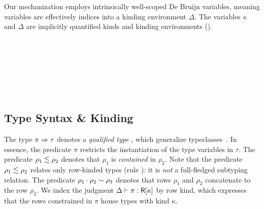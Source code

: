\documentclass[sigplan,screen]{acmart}
\begin{document}
Our mechanization employs intrinsically well-scoped De Bruijn variables, meaning variables are effectively indices into a kinding environment $\Delta$. The variables $\kappa$ and $\Delta$ are implicitly quantified kinds and kinding environments ().

\begin{code}[hide]%
%
\>[2]\<%
\\
\>[2][@{}l@{\AgdaIndent{0}}]%
\>[4]\<%
\\
\>[4][@{}l@{\AgdaIndent{0}}]%
\>[6]\AgdaSpace{}%
\AgdaSpace{}%
\AgdaSpace{}%
\AgdaSpace{}%
\AgdaSymbol{:}\AgdaSpace{}%
\<%
\\
%
\>[6]\AgdaSpace{}%
\AgdaSpace{}%
\AgdaSpace{}%
\AgdaSymbol{:}\AgdaSpace{}%
\<%
\end{code}
\begin{code} %
%
\>[2]\AgdaSpace{}%
\AgdaSpace{}%
\AgdaSymbol{:}\AgdaSpace{}%
\AgdaSpace{}%
\AgdaSpace{}%
\AgdaSpace{}%
\AgdaSpace{}%
\AgdaSpace{}%
\<%
\\
\>[2][@{}l@{\AgdaIndent{0}}]%
\>[4]\AgdaSpace{}%
\AgdaSymbol{:}\AgdaSpace{}%
\AgdaSpace{}%
\AgdaSymbol{(}\AgdaSpace{}%
\AgdaOperator{\AgdaInductiveConstructor{,}}\AgdaSpace{}%
\AgdaSymbol{)}\AgdaSpace{}%
\<%
\\
%
\>[4]\AgdaSpace{}%
\AgdaSymbol{:}\AgdaSpace{}%
\AgdaSpace{}%
\AgdaSpace{}%
\AgdaSpace{}%
\AgdaSpace{}%
\AgdaSpace{}%
\AgdaSymbol{(}\AgdaSpace{}%
\AgdaOperator{\AgdaInductiveConstructor{,}}\AgdaSpace{}%
\AgdaSymbol{)}\AgdaSpace{}%
\<%
\end{code}

\subsection{Type Syntax \& Kinding}


The type $\pi \Rightarrow \tau$ denotes a \emph{qualified type} \citep{Jones92}, which generalize typeclasses~\citep{WadlerB89}. In essence, the predicate $\pi$ restricts the instantiation of the type variables in $\tau$. The predicate $\LeqP {\rho_1} {\rho_2}$ denotes that $\rho_1$ is \emph{contained} in $\rho_2$. Note that the predicate $\LeqP {\rho_1} {\rho_2}$ relates only row-kinded types (rule \ksrule{$\lesssim$}): it is \emph{not} a full-fledged subtyping relation. The predicate $\rho_{1} \cdot \rho_{2} \sim \rho_{3}$ denotes that rows $\rho_{1}$ and $\rho_{2}$ concatenate to the row $\rho_{3}$. We index the judgment $\Delta \vdash \pi : \mathsf{R}[{\kappa}]$ by row kind, which expresses that the rows constrained in $\pi$ house types with kind $\kappa$.
\end{document}
